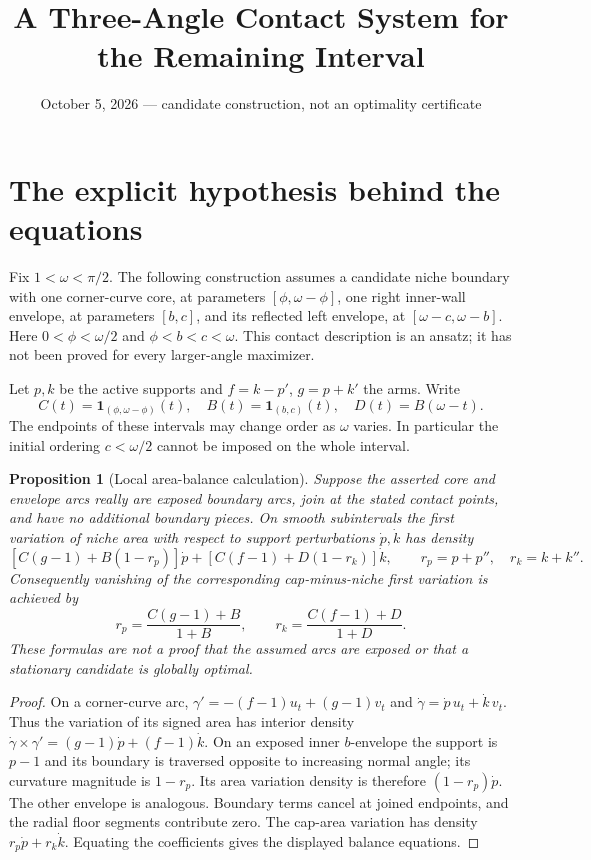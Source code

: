 \documentclass[11pt]{article}
\title{A Three-Angle Contact System for the Remaining Interval}
\author{}\date{October 5, 2026 --- candidate construction, not an optimality certificate}
\newtheorem{proposition}{Proposition}
\begin{document}
\maketitle

\section*{The explicit hypothesis behind the equations}
Fix $1<\omega<\pi/2$. The following construction assumes a candidate niche boundary with one corner-curve core, at parameters $[\phi,\omega-\phi]$, one right inner-wall envelope, at parameters $[b,c]$, and its reflected left envelope, at $[\omega-c,\omega-b]$. Here $0<\phi<\omega/2$ and $\phi<b<c<\omega$. This contact description is an ansatz; it has not been proved for every larger-angle maximizer.

Let $p,k$ be the active supports and $f=k-p'$, $g=p+k'$ the arms. Write
\[
 C(t)=\mathbf1_{(\phi,\omega-\phi)}(t),\quad
 B(t)=\mathbf1_{(b,c)}(t),\quad D(t)=B(\omega-t).
\]
The endpoints of these intervals may change order as $\omega$ varies. In particular the initial ordering $c<\omega/2$ cannot be imposed on the whole interval.

\begin{proposition}[Local area-balance calculation]
Suppose the asserted core and envelope arcs really are exposed boundary arcs, join at the stated contact points, and have no additional boundary pieces. On smooth subintervals the first variation of niche area with respect to support perturbations $\dot p,\dot k$ has density
\[
 [C(g-1)+B(1-r_p)]\dot p+[C(f-1)+D(1-r_k)]\dot k,
 \qquad r_p=p+p'',\quad r_k=k+k''.
\]
Consequently vanishing of the corresponding cap-minus-niche first variation is achieved by
\[
 r_p=\frac{C(g-1)+B}{1+B},\qquad
 r_k=\frac{C(f-1)+D}{1+D}.
\]
These formulas are not a proof that the assumed arcs are exposed or that a stationary candidate is globally optimal.
\end{proposition}
\begin{proof}
On a corner-curve arc, $\gamma'=-(f-1)u_t+(g-1)v_t$ and $\dot\gamma=\dot p\,u_t+\dot k\,v_t$. Thus the variation of its signed area has interior density $\dot\gamma\times\gamma'=(g-1)\dot p+(f-1)\dot k$. On an exposed inner $b$-envelope the support is $p-1$ and its boundary is traversed opposite to increasing normal angle; its curvature magnitude is $1-r_p$. Its area variation density is therefore $(1-r_p)\dot p$. The other envelope is analogous. Boundary terms cancel at joined endpoints, and the radial floor segments contribute zero. The cap-area variation has density $r_p\dot p+r_k\dot k$. Equating the coefficients gives the displayed balance equations.
\end{proof}
\end{document}

